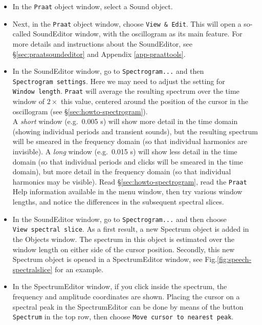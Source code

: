 \documentclass[
]{book}
\begin{document}
\begin{itemize}
\item
  In the \texttt{Praat} object window, select a Sound object.
\item
  Next, in the \texttt{Praat} object window, choose \texttt{View\ \&\ Edit}. This will open a so-called SoundEditor window, with the oscillogram as its main feature. For more details and instructions about the SoundEditor, see §\ref{sec:praatsoundeditor} and Appendix \ref{app-praattools}.
\item
  In the SoundEditor window, go to \texttt{Spectrogram...} and then \texttt{Spectrogram\ settings}. Here we may need to adjust the setting for \texttt{Window\ length}. \texttt{Praat} will average the resulting spectrum over the time window of \(2\times\) this value, centered around the position of the cursor in the oscillogram (see §\ref{sec:howto-spectrogram}).\\
  A \emph{short} window (e.g.~0.005 s) will show more detail in the time domain (showing individual periods and transient sounds), but the resulting spectrum will be smeared in the frequency domain (so that individual harmonics are invisible). A \emph{long} window (e.g.~0.015 s) will show less detail in the time domain (so that individual periods and clicks will be smeared in the time domain), but more detail in the frequency domain (so that individual harmonics may be visible). Read §\ref{sec:howto-spectrogram}, read the \texttt{Praat} Help information available in the menu window, then try various window lengths, and notice the differences in the subsequent spectral slices.
\item
  In the SoundEditor window, go to \texttt{Spectrogram...} and then choose \texttt{View\ spectral\ slice}. As a first result, a new Spectrum object is added in the Objects window. The spectrum in this object is estimated over the window length on either side of the cursor position. Secondly, this new Spectrum object is opened in a SpectrumEditor window, see Fig.\ref{fig:speech-spectralslice} for an example.
\item
  In the SpectrumEditor window, if you click inside the spectrum, the frequency and amplitude coordinates are shown. Placing the cursor on a spectral peak in the SpectrumEditor can be done by means of the button \texttt{Spectrum} in the top row, then choose \texttt{Move\ cursor\ to\ nearest\ peak}.
\end{itemize}
\end{document}
